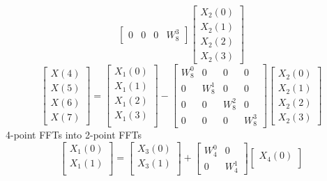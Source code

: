 \documentclass[journal,12pt,twocolumn]{IEEEtran}
\renewcommand\thesection{\arabic{section}}
\begin{document}
\begin{enumerate}[label=\arabic*.,ref=\thesection.\theenumi]
\begin{equation}
\begin{bmatrix}
			0 & 0 & 0 & W^{3}_{8}
		\end{bmatrix}
		\begin{bmatrix}
			X_{2}(0) \\ 
			X_{2}(1) \\ 
			X_{2}(2) \\
			X_{2}(3)
		\end{bmatrix}
	\end{equation}
	\begin{equation}
		\begin{bmatrix}
			X(4) \\ 
			X(5) \\ 
			X(6) \\ 
			X(7)
		\end{bmatrix}
		=
		\begin{bmatrix}
			X_{1}(0) \\ 
			X_{1}(1)\\ 
			X_{1}(2)\\
			X_{1}(3)\\
		\end{bmatrix}
		-
		\begin{bmatrix}
			W^{0}_{8} & 0 & 0 & 0\\
			0 & W^{1}_{8} & 0 & 0\\
			0 & 0 & W^{2}_{8} & 0\\
			0 & 0 & 0 & W^{3}_{8}
		\end{bmatrix}
		\begin{bmatrix}
			X_{2}(0) \\ 
			X_{2}(1) \\ 
			X_{2}(2) \\
			X_{2}(3)
		\end{bmatrix}
	\end{equation}
	4-point FFTs into 2-point FFTs
	\begin{equation}
		\begin{bmatrix}
			X_{1}(0) \\ 
			X_{1}(1)\\ 
		\end{bmatrix}
		=
		\begin{bmatrix}
			X_{3}(0) \\ 
			X_{3}(1)\\ 
		\end{bmatrix}
		+
		\begin{bmatrix}
			W^{0}_{4} & 0\\
			0 & W^{1}_{4}
		\end{bmatrix}
		\begin{bmatrix}
			X_{4}(0) \\ 

\end{bmatrix}
\end{equation}
\end{enumerate}
\end{document}

